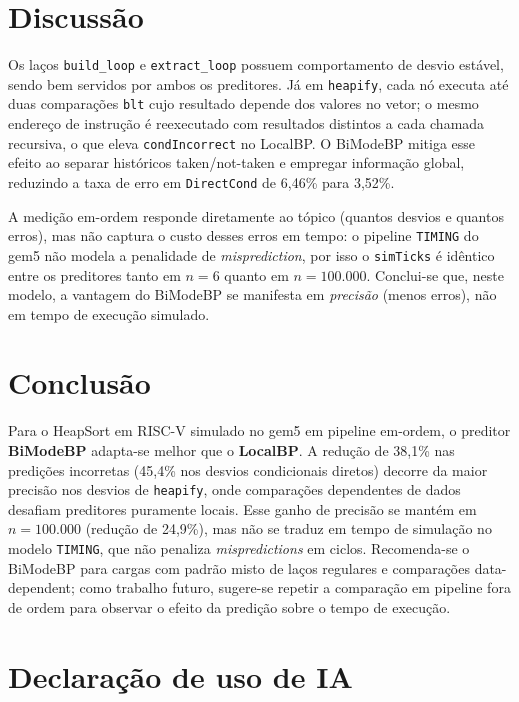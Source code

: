 \documentclass[12pt]{article}
\begin{document}
\section{Discuss{\~a}o}

Os la{\c{c}}os \texttt{build\_loop} e \texttt{extract\_loop} possuem comportamento de desvio estável, sendo bem servidos por ambos os preditores. Já em \texttt{heapify}, cada nó executa até duas comparações \texttt{blt} cujo resultado depende dos valores no vetor; o mesmo endereço de instrução é reexecutado com resultados distintos a cada chamada recursiva, o que eleva \texttt{condIncorrect} no LocalBP. O BiModeBP mitiga esse efeito ao separar históricos taken/not-taken e empregar informação global, reduzindo a taxa de erro em \texttt{DirectCond} de 6,46\% para 3,52\%.

A medição em-ordem responde diretamente ao tópico (quantos desvios e quantos erros), mas não captura o custo desses erros em tempo: o pipeline \texttt{TIMING} do gem5 não modela a penalidade de \emph{misprediction}, por isso o \texttt{simTicks} é idêntico entre os preditores tanto em $n=6$ quanto em $n=100.000$. Conclui-se que, neste modelo, a vantagem do BiModeBP se manifesta em \emph{precisão} (menos erros), não em tempo de execução simulado.

\section{Conclusão}

Para o HeapSort em RISC-V simulado no gem5 em pipeline em-ordem, o preditor \textbf{BiModeBP} adapta-se melhor que o \textbf{LocalBP}. A redução de 38,1\% nas predições incorretas (45,4\% nos desvios condicionais diretos) decorre da maior precisão nos desvios de \texttt{heapify}, onde comparações dependentes de dados desafiam preditores puramente locais. Esse ganho de precisão se mantém em $n=100.000$ (redução de 24,9\%), mas não se traduz em tempo de simulação no modelo \texttt{TIMING}, que não penaliza \emph{mispredictions} em ciclos. Recomenda-se o BiModeBP para cargas com padrão misto de laços regulares e comparações data-dependent; como trabalho futuro, sugere-se repetir a comparação em pipeline fora de ordem para observar o efeito da predição sobre o tempo de execução.

\section*{Declaração de uso de IA}
\end{document}
